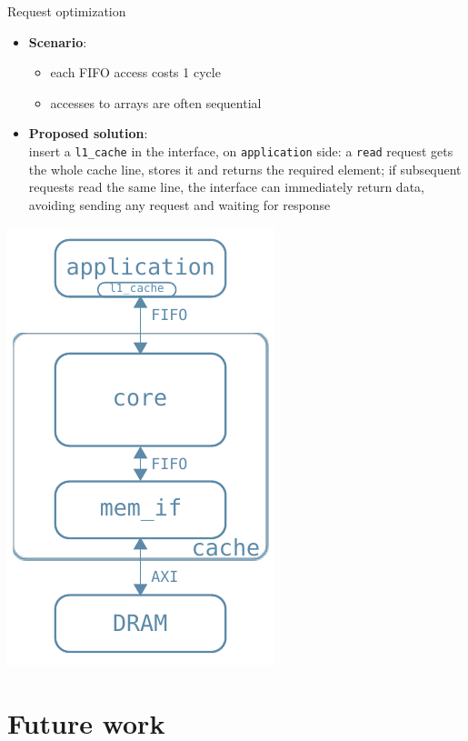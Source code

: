 \documentclass{beamer}
\begin{document}
\begin{frame}{Request optimization}
	\begin{minipage}{.7\textwidth}
		\begin{itemize}
			\item \textbf{Scenario}:
				\begin{itemize}
					\item each FIFO access costs 1 cycle
					\item accesses to arrays are often sequential
				\end{itemize}
			\item \textbf{Proposed solution}:\\
				insert a \texttt{l1\_cache} in the interface,
				on \texttt{application} side: a \texttt{read} request
				gets the whole cache line, stores it and returns the
				required element; if subsequent requests read the same
				line, the interface can immediately return data, avoiding
				sending any request and waiting for response
		\end{itemize}
	\end{minipage}
	\begin{minipage}{.29\textwidth}
		\begin{center}
			\includegraphics[width=.9\textwidth,height=.9\textheight,keepaspectratio]{l1_arch.pdf}
		\end{center}
	\end{minipage}
\end{frame}

\section{Future work}
\end{document}

